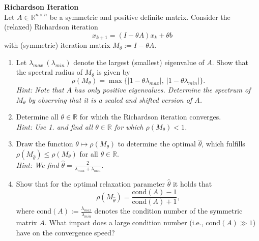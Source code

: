 \textbf{Richardson Iteration}\\
Let $A \in \mathbb{R}^{n\times n}$ be a symmetric and positive definite matrix.  Consider the (relaxed) Richardson iteration 
$$x_{k+1} = (I -  \theta A)x_k + \theta b $$
with (symmetric) iteration matrix $M_\theta := I-\theta A$.
\begin{enumerate}
	\item Let $\lambda_{max} ~(\lambda_{min})$ denote the largest (smallest) eigenvalue of $A$. Show that the spectral radius of $M_\theta$ is given by  $$\rho(M_\theta) = \max\{|1 - \theta \lambda_{max}|, ~|1 - \theta \lambda_{min}|\}.$$ 
	\textit{Hint: Note that $A$ has only \textit{positive} eigenvalues. Determine the spectrum of $M_\theta$ by observing that it is a scaled and shifted version of $A$.}
	\item  Determine all $\theta \in \mathbb{R}$ for which the Richardson iteration converges.\\[0.1cm]
	\textit{Hint: Use 1. and find all $\theta \in \mathbb{R}$ for which $\rho(M_\theta) < 1$.}
	\item Draw the function $\theta \mapsto \rho(M_\theta)$ to determine the optimal $\hat{\theta}$, which fulfills
	$\rho(M_{\hat{\theta}}) \leq  \rho(M_{\theta})$
	for all $\theta \in \mathbb{R}$. \\[0.1cm]
	\textit{Hint: We find $\hat{\theta} = \frac{2}{\lambda_{max} + \lambda_{min}}$.} 
	\item Show that for the optimal relaxation parameter $\hat{\theta}$ it holds that
	$$\rho(M_{\hat{\theta}}) = \frac{\text{cond}(A) -1}{\text{cond}(A) +1},$$
	where $\text{cond}(A) := \frac{\lambda_{max}}{\lambda_{min}}$ denotes the condition number of the symmetric matrix $A$. What impact does a large condition number (i.e., $\text{cond}(A) \gg 1$) have on the convergence speed?
\end{enumerate}
